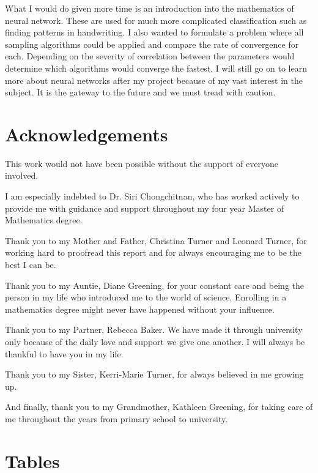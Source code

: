 \documentclass[12pt,twoside]{report}   %
\begin{document}
What I would do given more time is an introduction into the mathematics of neural network. These are used for much more complicated classification such as finding patterns in handwriting. I also wanted to formulate a problem where all sampling algorithms could be applied and compare the rate of convergence for each. Depending on the severity of correlation between the parameters would determine which algorithms would converge the fastest. I will still go on to learn more about neural networks after my project because of my vast interest in the subject. It is the gateway to the future and we must tread with caution.

\chapter*{Acknowledgements}

This work would not have been possible without the support of everyone involved.

I am especially indebted to Dr. Siri Chongchitnan, who has worked actively to provide me with guidance and support throughout my four year Master of Mathematics degree.

Thank you to my Mother and Father, Christina Turner and Leonard Turner, for working hard to proofread this report and for always encouraging me to be the best I can be.

Thank you to my Auntie, Diane Greening, for your constant care and being the person in my life who introduced me to the world of science. Enrolling in a mathematics degree might never have happened without your influence.

Thank you to my Partner, Rebecca Baker. We have made it through university only because of the daily love and support we give one another. I will always be thankful to have you in my life.

Thank you to my Sister, Kerri-Marie Turner, for always believed in me growing up.

And finally, thank you to my Grandmother, Kathleen Greening, for taking care of me throughout the years from primary school to university.



\pagebreak

\pagestyle{plain}
\appendix
\chapter{Tables}
\end{document}
